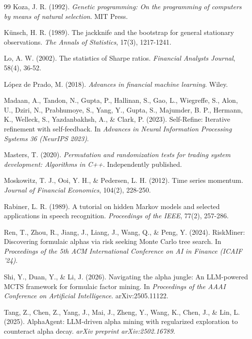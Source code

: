 \documentclass[12pt,a4paper,oneside]{book}
\theoremstyle{definition}
\begin{document}
\begin{thebibliography}{99}
Koza, J. R. (1992). \textit{Genetic programming: On the programming of computers by means of natural selection}. MIT Press.

K\"unsch, H. R. (1989). The jackknife and the bootstrap for general stationary observations. \textit{The Annals of Statistics}, 17(3), 1217-1241.

Lo, A. W. (2002). The statistics of Sharpe ratios. \textit{Financial Analysts Journal}, 58(4), 36-52.

L\'opez de Prado, M. (2018). \textit{Advances in financial machine learning}. Wiley.

Madaan, A., Tandon, N., Gupta, P., Hallinan, S., Gao, L., Wiegreffe, S., Alon, U., Dziri, N., Prabhumoye, S., Yang, Y., Gupta, S., Majumder, B. P., Hermann, K., Welleck, S., Yazdanbakhsh, A., \& Clark, P. (2023). Self-Refine: Iterative refinement with self-feedback. In \textit{Advances in Neural Information Processing Systems 36 (NeurIPS 2023)}.

Masters, T. (2020). \textit{Permutation and randomization tests for trading system development: Algorithms in C++}. Independently published.

Moskowitz, T. J., Ooi, Y. H., \& Pedersen, L. H. (2012). Time series momentum. \textit{Journal of Financial Economics}, 104(2), 228-250.

Rabiner, L. R. (1989). A tutorial on hidden Markov models and selected applications in speech recognition. \textit{Proceedings of the IEEE}, 77(2), 257-286.

Ren, T., Zhou, R., Jiang, J., Liang, J., Wang, Q., \& Peng, Y. (2024). RiskMiner: Discovering formulaic alphas via risk seeking Monte Carlo tree search. In \textit{Proceedings of the 5th ACM International Conference on AI in Finance (ICAIF '24)}.

Shi, Y., Duan, Y., \& Li, J. (2026). Navigating the alpha jungle: An LLM-powered MCTS framework for formulaic factor mining. In \textit{Proceedings of the AAAI Conference on Artificial Intelligence}. arXiv:2505.11122.

Tang, Z., Chen, Z., Yang, J., Mai, J., Zheng, Y., Wang, K., Chen, J., \& Lin, L. (2025). AlphaAgent: LLM-driven alpha mining with regularized exploration to counteract alpha decay. \textit{arXiv preprint arXiv:2502.16789}.


\end{thebibliography}
\end{document}
